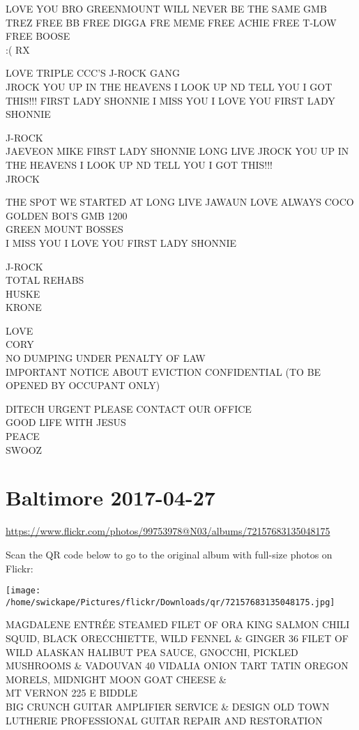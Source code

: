 \documentclass[10pt,letterpaper]{article}
\begin{document}
LOVE YOU BRO GREENMOUNT WILL NEVER BE THE SAME GMB\\
TREZ FREE BB FREE DIGGA FRE MEME FREE ACHIE FREE T{-}LOW FREE BOOSE\\
:( RX

LOVE TRIPLE CCC'S J{-}ROCK GANG\\
JROCK YOU UP IN THE HEAVENS I LOOK UP ND TELL YOU I GOT THIS!!! FIRST LADY SHONNIE I MISS YOU I LOVE YOU FIRST LADY SHONNIE

J{-}ROCK\\
JAEVEON MIKE FIRST LADY SHONNIE LONG LIVE JROCK YOU UP IN THE HEAVENS I LOOK UP ND TELL YOU I GOT THIS!!!\\
JROCK

THE SPOT WE STARTED AT LONG LIVE JAWAUN LOVE ALWAYS COCO\\
GOLDEN BOI'S GMB 1200\\
GREEN MOUNT BOSSES\\
I MISS YOU I LOVE YOU FIRST LADY SHONNIE

J{-}ROCK\\
TOTAL REHABS\\
HUSKE\\
KRONE

LOVE\\
CORY\\
NO DUMPING UNDER PENALTY OF LAW\\
IMPORTANT NOTICE ABOUT EVICTION CONFIDENTIAL (TO BE OPENED BY OCCUPANT ONLY)

DITECH URGENT PLEASE CONTACT OUR OFFICE\\
GOOD LIFE WITH JESUS\\
PEACE\\
SWOOZ
\pagebreak

\section*{Baltimore 2017-04-27}

\url{https://www.flickr.com/photos/99753978@N03/albums/72157683135048175}

Scan the QR code below to go to the original album with full-size photos on Flickr:

\texttt{[image: /home/swickape/Pictures/flickr/Downloads/qr/72157683135048175.jpg]}
\pagebreak

MAGDALENE ENTRÉE STEAMED FILET OF ORA KING SALMON CHILI SQUID, BLACK ORECCHIETTE, WILD FENNEL \& GINGER 36 FILET OF WILD ALASKAN HALIBUT PEA SAUCE, GNOCCHI, PICKLED MUSHROOMS \& VADOUVAN 40 VIDALIA ONION TART TATIN OREGON MORELS, MIDNIGHT MOON GOAT CHEESE \&\\
MT VERNON 225 E BIDDLE\\
BIG CRUNCH GUITAR AMPLIFIER SERVICE \& DESIGN OLD TOWN LUTHERIE PROFESSIONAL GUITAR REPAIR AND RESTORATION
\end{document}
